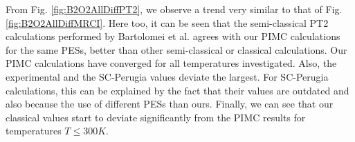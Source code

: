     From Fig. \ref{fig:B2O2AllDiffPT2}, we observe a trend very similar to that of Fig. \ref{fig:B2O2AllDiffMRCI}. Here too, it can be seen that the semi-classical PT2 calculations performed by Bartolomei et al. \cite{Bartolomei2010} agrees with our PIMC calculations for the same PESs, better than other semi-classical or classical calculations. Our PIMC calculations have converged for all temperatures investigated. Also, the experimental and the SC-Perugia values deviate the largest. For SC-Perugia calculations, this can be explained by the fact that their values are outdated and also because the use of different PESs than ours. Finally, we can see that our classical values start to deviate significantly from the PIMC results for temperatures $T \le 300K$.
